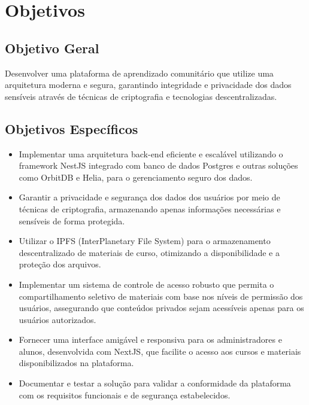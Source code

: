 \section{Objetivos}
\subsection{Objetivo Geral}

Desenvolver uma plataforma de aprendizado comunitário que utilize uma arquitetura moderna e segura, garantindo integridade e privacidade dos dados sensíveis através de técnicas de criptografia e tecnologias descentralizadas.

\subsection{Objetivos Específicos}

\begin{itemize}
    \item Implementar uma arquitetura back-end eficiente e escalável utilizando o framework NestJS integrado com banco de dados Postgres e outras soluções como OrbitDB e Helia, para o gerenciamento seguro dos dados.
    \item Garantir a privacidade e segurança dos dados dos usuários por meio de técnicas de criptografia, armazenando apenas informações necessárias e sensíveis de forma protegida.
    \item Utilizar o IPFS (InterPlanetary File System) para o armazenamento descentralizado de materiais de curso, otimizando a disponibilidade e a proteção dos arquivos.
    \item Implementar um sistema de controle de acesso robusto que permita o compartilhamento seletivo de materiais com base nos níveis de permissão dos usuários, assegurando que conteúdos privados sejam acessíveis apenas para os usuários autorizados.
    \item Fornecer uma interface amigável e responsiva para os administradores e alunos, desenvolvida com NextJS, que facilite o acesso aos cursos e materiais disponibilizados na plataforma.
    \item Documentar e testar a solução para validar a conformidade da plataforma com os requisitos funcionais e de segurança estabelecidos.
\end{itemize}
  